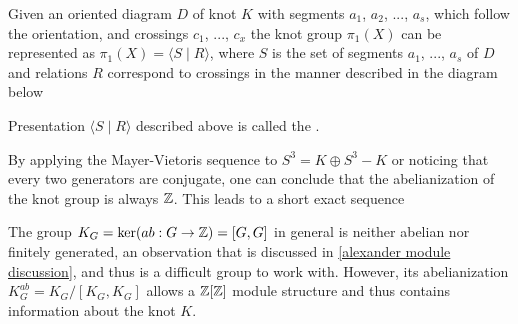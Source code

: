 \begin{definition}
  Given an oriented diagram $D$ of knot $K$ with segments $a_1$, $a_2$, ..., $a_s$, which follow the orientation, and crossings $c_1$, ..., $c_x$ the knot group $\pi_1(X)$ can be represented as $\pi_1(X)=\langle S\;|\;R\rangle$, where $S$ is the set of segments $a_1$, ..., $a_s$ of $D$ and relations $R$ correspond to crossings in the manner described in the diagram below
  \begin{center}
  \end{center}
  Presentation $\langle S\;|\;R\rangle$ described above is called the  \cite[Chapter~6]{livingstone}.
\end{definition}

By applying the Mayer-Vietoris sequence to $S^3=K\oplus S^3-K$ or noticing that every two generators are conjugate, one can conclude that the abelianization of the knot group is always $\operatorname{\mathbb{Z}}$. This leads to a short exact sequence
\begin{center}
\end{center}

The group $K_G=\ker(ab:G\to\operatorname{\mathbb{Z}})=[G, G]$ in general is neither abelian nor finitely generated, an observation that is discussed in \cref{alexander module discussion}, and thus is a difficult group to work with. However, its abelianization $K_G^{ab}=K_G/[K_G, K_G]$ allows a $\operatorname{\mathbb{Z}}[\operatorname{\mathbb{Z}}]$ module structure and thus contains information about the knot $K$. 

